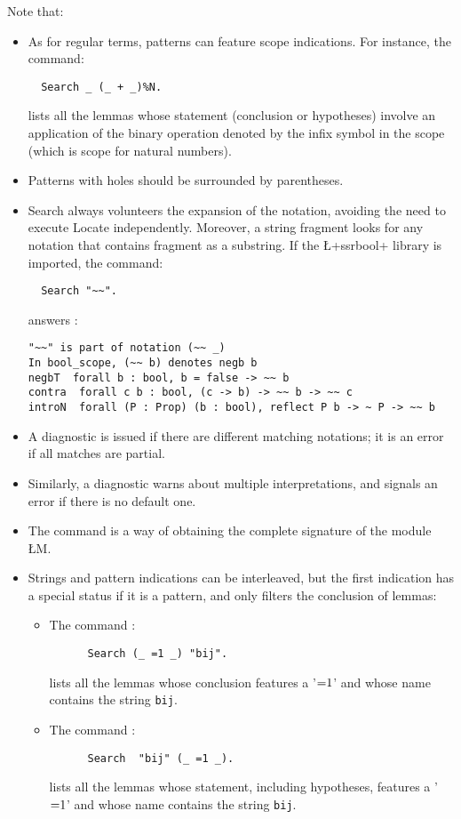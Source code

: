 Note that:
\begin{itemize}
\item As for regular terms, patterns can feature scope
  indications. For instance, the command:
\begin{lstlisting}
  Search _ (_ + _)%N.
\end{lstlisting}
lists all the lemmas whose statement (conclusion or hypotheses)
involve an application of the binary operation denoted by the infix
\C{+} symbol in the  scope (which is \ssr{} scope for natural numbers).
\item Patterns with holes should be surrounded by parentheses.
\item Search always volunteers the expansion of the notation, avoiding the
  need to execute Locate independently. Moreover, a string fragment
  looks for any notation that contains fragment as
  a substring. If the \L+ssrbool+ library is imported, the command:
\begin{lstlisting}
  Search "~~".
\end{lstlisting}
answers :
\begin{lstlisting}
"~~" is part of notation (~~ _)
In bool_scope, (~~ b) denotes negb b
negbT  forall b : bool, b = false -> ~~ b
contra  forall c b : bool, (c -> b) -> ~~ b -> ~~ c
introN  forall (P : Prop) (b : bool), reflect P b -> ~ P -> ~~ b
\end{lstlisting}
 \item A diagnostic is issued if there are different matching notations;
  it is an error if all matches are partial.
\item Similarly, a diagnostic warns about multiple interpretations, and
  signals an error if there is no default one.
\item The command  
is a way of obtaining the complete signature of the module \L{M}.
\item Strings and pattern indications can be interleaved, but the
  first indication has a special status if it is a pattern, and only
  filters the conclusion of lemmas:
\begin{itemize}
  \item The command :
    \begin{lstlisting}
      Search (_ =1 _) "bij".
    \end{lstlisting}
lists all the lemmas whose conclusion features a '$\C{=1}$' and whose
name contains the string \verb+bij+.
\item The command :
    \begin{lstlisting}
      Search  "bij" (_ =1 _).
    \end{lstlisting}
lists all the lemmas whose statement, including hypotheses, features a
'$\C{=1}$' and whose name contains the string \verb+bij+.

\end{itemize}

\end{itemize}

